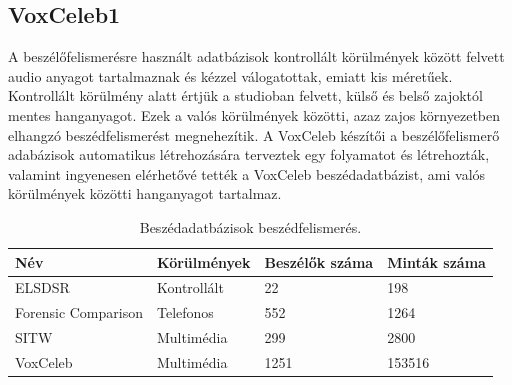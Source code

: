 \subsection{VoxCeleb1} \label{voxceleb1}

A beszélőfelismerésre használt adatbázisok kontrollált körülmények között felvett audio anyagot tartalmaznak és kézzel válogatottak, emiatt kis méretűek. Kontrollált körülmény alatt értjük a studioban felvett, külső és belső zajoktól mentes hanganyagot. Ezek a valós körülmények közötti, azaz zajos környezetben elhangzó beszédfelismerést megnehezítik. A VoxCeleb készítői a beszélőfelismerő adabázisok automatikus létrehozására terveztek egy folyamatot és létrehozták, valamint ingyenesen elérhetővé tették a VoxCeleb beszédadatbázist, ami valós körülmények közötti hanganyagot tartalmaz.
\newline
\newline

\begin{table}[!ht]
	\begin{tabular}{*4l} \toprule
		\bfseries Név & \bfseries Körülmények & \bfseries Beszélők száma & \bfseries Minták száma \\ \midrule
		ELSDSR                             & Kontrollált & 22     & 198          \\
		\rowcolor{gray!10} 
		Forensic Comparison                & Telefonos   & 552   & 1264        \\
		SITW                           & Multimédia        & 299   & 2800        \\
		\rowcolor{gray!10} 
		VoxCeleb                           & Multimédia        & 1251   & 153516        \\
		\bottomrule
		\hline
	\end{tabular}
	\centering
	\caption{Beszédadatbázisok beszédfelismerés.}
	\label{fig:speaker-recognition-datasets}
\end{table}

